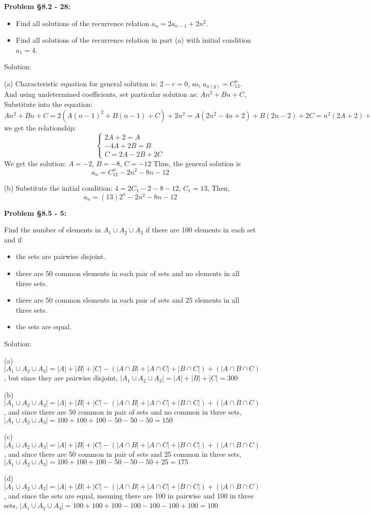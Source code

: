 \documentclass{article}
\newenvironment{problem}[1]
    {\begin{mdframed}[default]
    \textbf{Problem #1:}
    }
    {\end{mdframed}
    }
\begin{document}
\begin{problem}{\S 8.2 - 28}
\begin{itemize}
    \item[(a)] Find all solutions of the recurrence relation $a_n = 2a_{n-1} + 2n^2$.
    \item[(b)] Find all solutions of the recurrence relation in part (a) with initial condition $a_1 = 4$.
\end{itemize}

Solution:

(a) Characteristic equation for general solution is: $2-r=0$, so, $a_{a(g)}=C_12^n$. And using undetermined coefficients, set particular solution as: $An^2+Bn+C$,
Substitute into the equation: $An^2+Bn+C=2(A(n-1)^2+B(n-1)+C)+2n^2=A(2n^2-4n+2)+B(2n-2)+2C=n^2(2A+2)+n(-4A+2B)+2A-2B+2C$
we get the relationship:\[\begin{cases}2A+2=A\\-4A+2B=B\\C=2A-2B+2C\end{cases}\]
We get the solution: $A=-2$, $B=-8$, $C=-12$
Thus, the general solution is \[a_n=C_12^n-2n^2-8n-12\]

(b) Substitute the initial condition: $4=2C_1-2-8-12$, $C_1=13$, Then, \[a_n=(13)2^n-2n^2-8n-12\]

\end{problem}

\begin{problem}{\S 8.5 - 5}
Find the number of elements in $A_1 \cup A_2 \cup A_3$ if there are 100 elements in each set and if
\begin{itemize}
    \item[(a)] the sets are pairwise disjoint.
    \item[(b)] there are 50 common elements in each pair of sets and no elements in all three sets.
    \item[(c)] there are 50 common elements in each pair of sets and 25 elements in all three sets.
    \item[(d)] the sets are equal.
\end{itemize}

Solution:

(a) $|A_1 \cup A_2 \cup A_3|=|A|+|B|+|C|-(|A\cap B|+|A\cap C|+|B\cap C|)+(|A\cap B\cap C)$, but since they are pairwise disjoint, $|A_1 \cup A_2 \cup A_3|=|A|+|B|+|C|=300$

(b) $|A_1 \cup A_2 \cup A_3|=|A|+|B|+|C|-(|A\cap B|+|A\cap C|+|B\cap C|)+(|A\cap B\cap C)$, and since there are 50 common in pair of sets and no common in three sets, $|A_1 \cup A_2 \cup A_3|=100+100+100-50-50-50=150$

(c) $|A_1 \cup A_2 \cup A_3|=|A|+|B|+|C|-(|A\cap B|+|A\cap C|+|B\cap C|)+(|A\cap B\cap C)$, and since there are 50 common in pair of sets and 25 common in three sets, $|A_1 \cup A_2 \cup A_3|=100+100+100-50-50-50+25=175$

(d) $|A_1 \cup A_2 \cup A_3|=|A|+|B|+|C|-(|A\cap B|+|A\cap C|+|B\cap C|)+(|A\cap B\cap C)$, and since the sets are equal, meaning there are 100 in pairwise and 100 in three sets, $|A_1 \cup A_2 \cup A_3|=100+100+100-100-100-100+100=100$

\end{problem}
\end{document}
